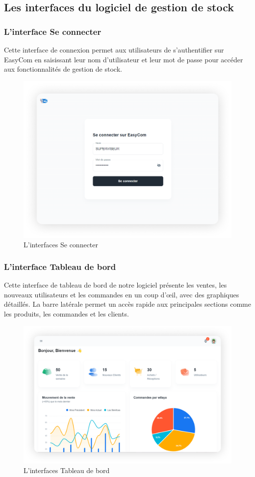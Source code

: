 \documentclass[edit,12pt,a4paper,ChapStyle,oneside,doubleinterligne]{report}
\begin{document}
\subsection{Les interfaces du logiciel de gestion de stock}
\subsubsection{L'interface Se connecter}
Cette interface de connexion permet aux utilisateurs de s'authentifier sur EasyCom en saisissant leur nom d'utilisateur et leur mot de passe pour accéder aux fonctionnalités de gestion de stock.
  \begin{figure} [H]
    \centering
    \includegraphics[width=1\textwidth]{images/sign in 1.png}
    \caption{L'interfaces Se connecter}
    \label{fig:se connecter}
\end{figure}
\subsubsection{L'interface Tableau de bord}
Cette interface de tableau de bord de notre logiciel présente les ventes, les nouveaux utilisateurs et les commandes en un coup d'œil, avec des graphiques détaillés. La barre latérale permet un accès rapide aux principales sections comme les produits, les commandes et les clients.
  \begin{figure} [H]
    \centering
    \includegraphics[width=1\textwidth]{images/dashbord 1.png}
    \caption{L'interfaces Tableau de bord}
    \label{fig:Tableau de bordr}
\end{figure}
\end{document}
